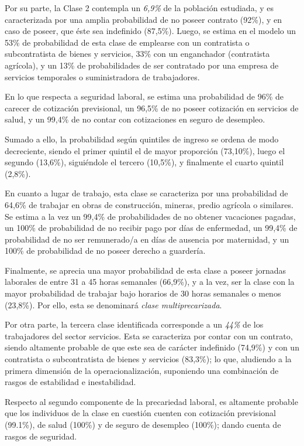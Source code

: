 \documentclass[
]{article}
\begin{document}
Por su parte, la Clase 2 contempla un \emph{6,9\%} de la población
estudiada, y es caracterizada por una amplia probabilidad de no poseer
contrato (92\%), y en caso de poseer, que éste sea indefinido (87,5\%).
Luego, se estima en el modelo un 53\% de probabilidad de esta clase de
emplearse con un contratista o subcontratista de bienes y servicios,
33\% con un enganchador (contratista agrícola), y un 13\% de
probabilidades de ser contratado por una empresa de servicios temporales
o suministradora de trabajadores.

En lo que respecta a seguridad laboral, se estima una probabilidad de
96\% de carecer de cotización previsional, un 96,5\% de no poseer
cotización en servicios de salud, y un 99,4\% de no contar con
cotizaciones en seguro de desempleo.

Sumado a ello, la probabilidad según quintiles de ingreso se ordena de
modo decreciente, siendo el primer quintil el de mayor proporción
(73,10\%), luego el segundo (13,6\%), siguiéndole el tercero (10,5\%), y
finalmente el cuarto quintil (2,8\%).

En cuanto a lugar de trabajo, esta clase se caracteriza por una
probabilidad de 64,6\% de trabajar en obras de construcción, mineras,
predio agrícola o similares. Se estima a la vez un 99,4\% de
probabilidades de no obtener vacaciones pagadas, un 100\% de
probabilidad de no recibir pago por días de enfermedad, un 99,4\% de
probabilidad de no ser remunerado/a en días de ausencia por maternidad,
y un 100\% de probabilidad de no poseer derecho a guardería.

Finalmente, se aprecia una mayor probabilidad de esta clase a poseer
jornadas laborales de entre 31 a 45 horas semanales (66,9\%), y a la
vez, ser la clase con la mayor probabilidad de trabajar bajo horarios de
30 horas semanales o menos (23,8\%). Por ello, esta se denominará
\emph{clase multiprecarizada}.

Por otra parte, la tercera clase identificada corresponde a un
\emph{44\%} de los trabajadores del sector servicios. Esta se
caracteriza por contar con un contrato, siendo altamente probable de que
este sea de carácter indefinido (74,9\%) y con un contratista o
subcontratista de bienes y servicios (83,3\%); lo que, aludiendo a la
primera dimensión de la operacionalización, suponiendo una combinación
de rasgos de estabilidad e inestabilidad.

Respecto al segundo componente de la precariedad laboral, es altamente
probable que los individuos de la clase en cuestión cuenten con
cotización previsional (99.1\%), de salud (100\%) y de seguro de
desempleo (100\%); dando cuenta de rasgos de seguridad.
\end{document}
